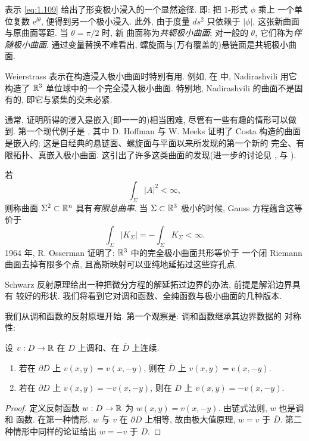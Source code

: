 表示 \eqref{eq:1.109} 给出了形变极小浸入的一个显然途径. 即: 把 $1$-形式 $\phi$ 乘上
一个单位复数 $\mathrm{e}^{\ii\theta}$, 便得到另一个极小浸入. 此外, 由于度量
$ds^2$ 只依赖于 $|\phi|$, 这张新曲面与原曲面等距. 当 $\theta=\pi/2$ 时, 新
曲面称为\emph{共轭极小曲面}; 对一般的 $\theta$, 它们称为\emph{伴随极小曲面}.
通过变量替换不难看出, 螺旋面与(万有覆盖的)悬链面是共轭极小曲面.

Weierstrass 表示在构造浸入极小曲面时特别有用. 例如, 在 \cite{Na1} 中,
Nadirashvili 用它构造了 $\mathbb{R}^3$ 单位球中的一个完全浸入极小曲面. 特别地,
Nadirashvili 的曲面不是固有的, 即它与紧集的交未必紧.

通常, 证明所得的浸入是嵌入(即一一的)相当困难, 尽管有一些有趣的情形可以做
到. 第一个现代例子是 \cite{HoMe1}, 其中 D. Hoffman 与 W. Meeks 证明了 Costa
构造的曲面是嵌入的; 这是自经典的悬链面、螺旋面与平面以来所发现的第一个新的
完全、有限拓扑、真嵌入极小曲面. 这引出了许多这类曲面的发现(进一步的讨论见
\cite{HoK}, \cite{Os2} 与 \cite{Ro}).

若
\[
\int_{\Sigma}|A|^{2}<\infty,
\]
则称曲面 $\Sigma^2\subset\mathbb{R}^n$ 具有\emph{有限总曲率}. 当 $\Sigma\subset\mathbb{R}^3$
极小的时候, Gauss 方程蕴含这等价于
\[
\int_{\Sigma}|K_{\Sigma}|=-\int_{\Sigma}K_{\Sigma}<\infty.
\]
1964 年, R. Osserman \cite{Os3} 证明了: $\mathbb{R}^3$ 中的完全极小曲面共形等价于
一个闭 Riemann 曲面去掉有限多个点, 且高斯映射可以亚纯地延拓过这些穿孔点.

Schwarz 反射原理给出一种把微分方程的解延拓过边界的办法, 前提是解沿边界具有
较好的形状. 我们将看到它对调和函数、全纯函数与极小曲面的几种版本.

我们从调和函数的反射原理开始. 第一个观察是: 调和函数继承其边界数据的
对称性:

\begin{lemma}
\label{lem:1.23}
设 $v:D\to\mathbb{R}$ 在 $D$ 上调和、在 $\overline{D}$ 上连续.
\begin{enumerate}
  \item 若在 $\partial D$ 上 $v(x,y)=v(x,-y)$, 则在 $\overline{D}$ 上
    $v(x,y)=v(x,-y)$.
  \item 若在 $\partial D$ 上 $v(x,y)=-v(x,-y)$, 则在 $\overline{D}$ 上
    $v(x,y)=-v(x,-y)$.
\end{enumerate}
\end{lemma}

\begin{proof}
定义反射函数 $w:D\to\mathbb{R}$ 为 $w(x,y)=v(x,-y)$. 由链式法则, $w$ 也是调和
函数. 在第一种情形, $w$ 与 $v$ 在 $\partial D$ 上相等, 故由极大值原理,
$w=v$ 于 $\overline{D}$. 第二种情形中同样的论证给出 $w=-v$ 于
$\overline{D}$.
\end{proof}

